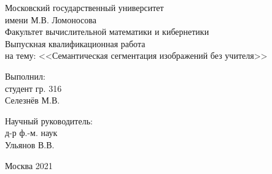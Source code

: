 \begin{titlepage}
    \begin{center} 
    \large Московский государственный университет \\ имени М.В. Ломоносова\\
    Факультет вычислительной математики и кибернетики\\[5.5cm] 
    
    \huge Выпускная квалификационная работа \\[0.6cm] %
    \large на тему:  <<Семантическая сегментация изображений без учителя>>\\[3.7cm]
    \end{center} 
    \vspace{2.5cm}
    
    \begin{flushright}
    Выполнил: \\
    студент гр. 316 \\
    Селезнёв М.В. \\
    \end{flushright}
    
    \begin{flushright}
    Научный руководитель:\\
    д-р ф.-м. наук \\
    Ульянов В.В. \\
    \end{flushright}
    
    \vfill
    
    \begin{center} 
    \large Москва 2021
    \end{center}
\end{titlepage}